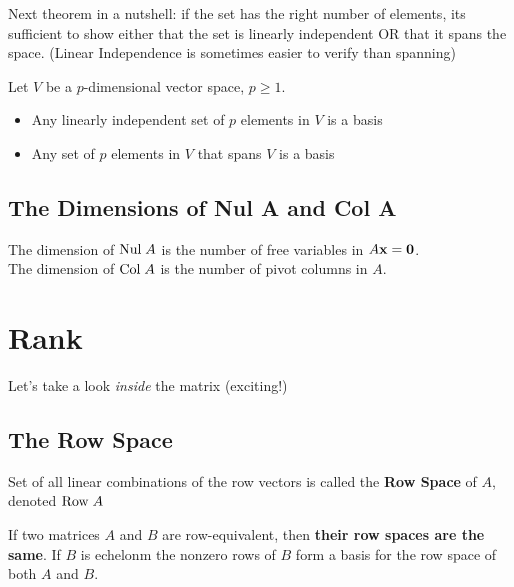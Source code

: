 \documentclass{report}
\begin{document}
Next theorem in a nutshell: if the set has the right number of elements, its sufficient
to show either that the set is linearly independent OR that it spans the space.
(Linear Independence is sometimes easier to verify than spanning)
\begin{theorem}
    Let $V$ be a $p$-dimensional vector space, $p \ge 1$.
    \begin{itemize}
        \item Any linearly independent set of $p$ elements in $V$ is a basis
        \item Any set of $p$ elements in $V$ that spans $V$ is a basis
    \end{itemize}
\end{theorem}

\subsection{The Dimensions of Nul A and Col A}

The dimension of $\mathrm{Nul}\; A$ is the number of free variables in $A\mathbf{x} = \mathbf{0}$.\\
The dimension of $\mathrm{Col}\; A$ is the number of pivot columns in $A$.\\

\section{Rank}
Let's take a look \textit{inside} the matrix (exciting!)

\subsection{The Row Space}

\begin{definition}
    Set of all linear combinations of the row vectors is called the \textbf{Row Space} of $A$, 
    denoted $\mathrm{Row}\; A$
\end{definition}

\begin{theorem}
    If two matrices $A$ and $B$ are row-equivalent, then \textbf{their row spaces are the same}. 
    If $B$ is echelonm the nonzero rows of $B$ form a basis for the row space of both $A$ and $B$.
\end{theorem}
\end{document}
